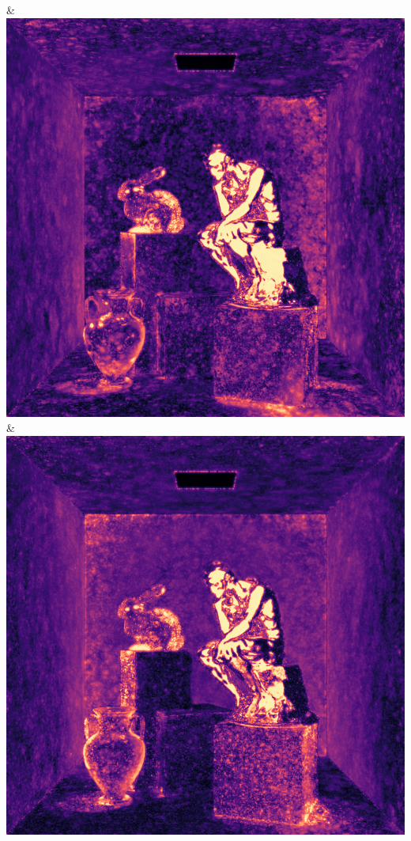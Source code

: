 & \includegraphics[width=\linewidth]{figures/py/tests/sppc_optimization/nrc+sppc14@4_1spp_thinker_flip.png}
& \includegraphics[width=\linewidth]{figures/py/tests/sppc_optimization/nrc+sppc16@1_1spp_thinker_flip.png}
